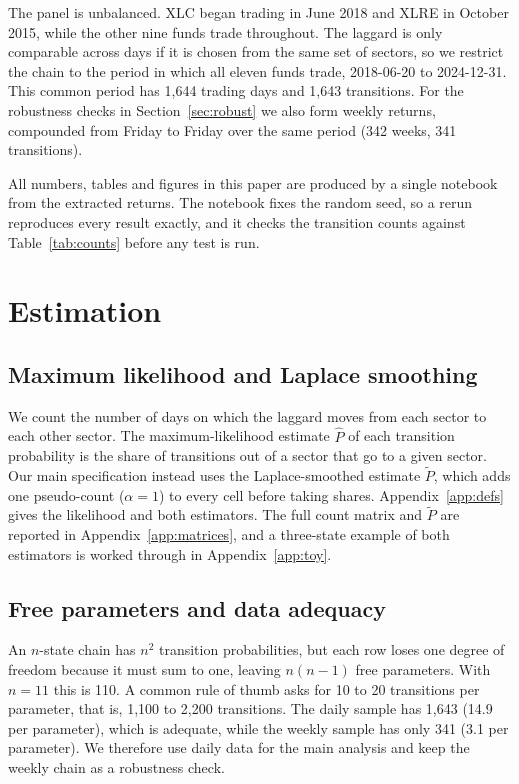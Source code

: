 \documentclass[11pt]{article}
\begin{document}
The panel is unbalanced. XLC began trading in June 2018 and XLRE in October 2015, while the other nine funds trade throughout. The laggard is only comparable across days if it is chosen from the same set of sectors, so we restrict the chain to the period in which all eleven funds trade, 2018-06-20 to 2024-12-31. This common period has 1{,}644 trading days and 1{,}643 transitions. For the robustness checks in Section~\ref{sec:robust} we also form weekly returns, compounded from Friday to Friday over the same period (342 weeks, 341 transitions).

All numbers, tables and figures in this paper are produced by a single notebook from the extracted returns. The notebook fixes the random seed, so a rerun reproduces every result exactly, and it checks the transition counts against Table~\ref{tab:counts} before any test is run.

\clearpage
\section{Estimation}
\label{sec:estimation}

\subsection{Maximum likelihood and Laplace smoothing}

We count the number of days on which the laggard moves from each sector to each other sector. The maximum-likelihood estimate $\hat P$ of each transition probability is the share of transitions out of a sector that go to a given sector. Our main specification instead uses the Laplace-smoothed estimate $\tilde P$, which adds one pseudo-count ($\alpha = 1$) to every cell before taking shares. Appendix~\ref{app:defs} gives the likelihood and both estimators. The full count matrix and $\tilde P$ are reported in Appendix~\ref{app:matrices}, and a three-state example of both estimators is worked through in Appendix~\ref{app:toy}.

\subsection{Free parameters and data adequacy}
\label{sec:sparsity}

An $n$-state chain has $n^2$ transition probabilities, but each row loses one degree of freedom because it must sum to one, leaving $n(n-1)$ free parameters. With $n=11$ this is 110. A common rule of thumb asks for 10 to 20 transitions per parameter, that is, 1{,}100 to 2{,}200 transitions. The daily sample has 1{,}643 (14.9 per parameter), which is adequate, while the weekly sample has only 341 (3.1 per parameter). We therefore use daily data for the main analysis and keep the weekly chain as a robustness check.
\end{document}
